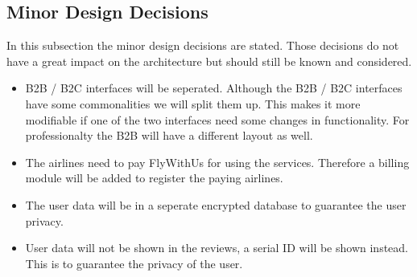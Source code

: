 \subsection{Minor Design Decisions}
In this subsection the minor design decisions are stated. Those decisions do not have a great impact on the architecture but should still be known and considered. 

\begin{itemize}
\item B2B / B2C interfaces will be seperated. Although the B2B / B2C interfaces have some commonalities we will split them up. This makes it more modifiable if one of the two interfaces need some changes in functionality.  For professionalty the B2B will have a different layout as well.

\item The airlines need to pay FlyWithUs for using the services. Therefore a billing module will be added to register the paying airlines. 

\item The user data will be in a seperate encrypted database to guarantee the user privacy.

\item User data will not be shown in the reviews, a serial ID will be shown instead. This is to guarantee the privacy of the user.
\end{itemize}
